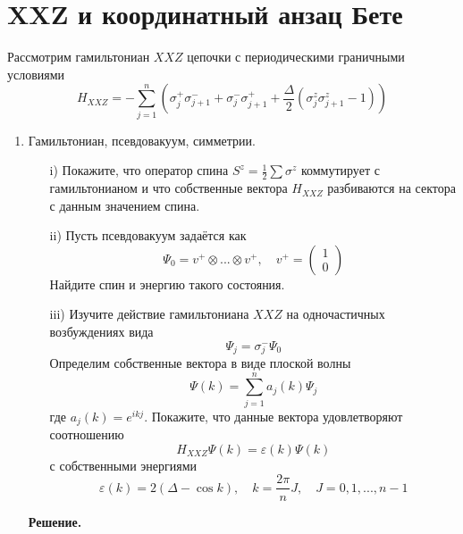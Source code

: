 \documentclass[12pt]{article}
\theoremstyle{definition}
\begin{document}
\section{XXZ и координатный анзац Бете}
Рассмотрим гамильтониан $XXZ$ цепочки с периодическими граничными условиями
\begin{equation}
    H_{XXZ}=-\sum\limits_{j=1}^n\left(\sigma^+_j\sigma^-_{j+1}+\sigma^-_j\sigma^+_{j+1}+\frac{\Delta}{2}(\sigma^z_j\sigma^z_{j+1}-1)\right)        
\end{equation}
\begin{enumerate}
    \item Гамильтониан, псевдовакуум, симметрии.
    \begin{itemize}
        \item[i)] Покажите, что оператор спина $S^z=\frac{1}{2}\sum\sigma^z$ коммутирует с гамильтонианом и что собственные вектора $H_{XXZ}$ разбиваются на сектора с данным значением спина.
        \item[ii)] Пусть псевдовакуум задаётся как
        \begin{equation}
            \Psi_0=v^+\otimes...\otimes v^+,\quad v^+=\begin{pmatrix}
                1\\0
            \end{pmatrix}
        \end{equation}
        Найдите спин и энергию такого состояния.
        \item[iii)] Изучите действие гамильтониана $XXZ$ на одночастичных возбуждениях вида
        \begin{equation}
            \Psi_j=\sigma^-_j\Psi_0
        \end{equation}
        Определим собственные вектора в виде плоской волны
        \begin{equation}
            \Psi(k)=\sum\limits_{j=1}^na_j(k)\Psi_j
        \end{equation}
        где $a_j(k)=e^{ikj}$. Покажите, что данные вектора удовлетворяют соотношению
        \begin{equation}
            H_{XXZ}\Psi(k)=\varepsilon(k)\Psi(k)
        \end{equation}
        с собственными энергиями
        \begin{equation}
            \varepsilon(k)=2(\Delta-\cos k),\quad k=\frac{2\pi}{n}J,\quad J=0,1,...,n-1
        \end{equation}
    \end{itemize}
    \textbf{Решение.}

\end{enumerate}
\end{document}
